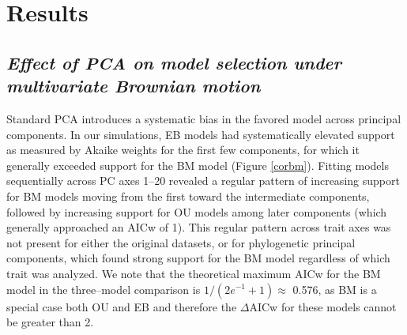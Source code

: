 \documentclass[a4paper,12pt]{article}
\begin{document}



\section{Results}
\subsection{\emph{Effect of PCA on model selection under multivariate Brownian motion}}
Standard PCA introduces a systematic bias in the favored model across principal components. In our simulations, EB models had systematically elevated support as measured by Akaike weights for the first few components, for which it generally exceeded support for the BM model (Figure \ref{corbm}). Fitting models sequentially across PC axes 1--20 revealed a regular pattern of increasing support for BM models moving from the first toward the intermediate components, followed by increasing support for OU models among later components (which generally approached an AICw of 1). This regular pattern across trait axes was not present for either the original datasets, or for phylogenetic principal components, which found strong support for the BM model regardless of which trait was analyzed. We note that the theoretical maximum AICw for the BM model in the three--model comparison is $1/(2e^{-1} + 1) \approx$ 0.576, as BM is a special case both OU and EB and therefore the $\Delta$AICw for these models cannot be greater than 2.   
\end{document}
